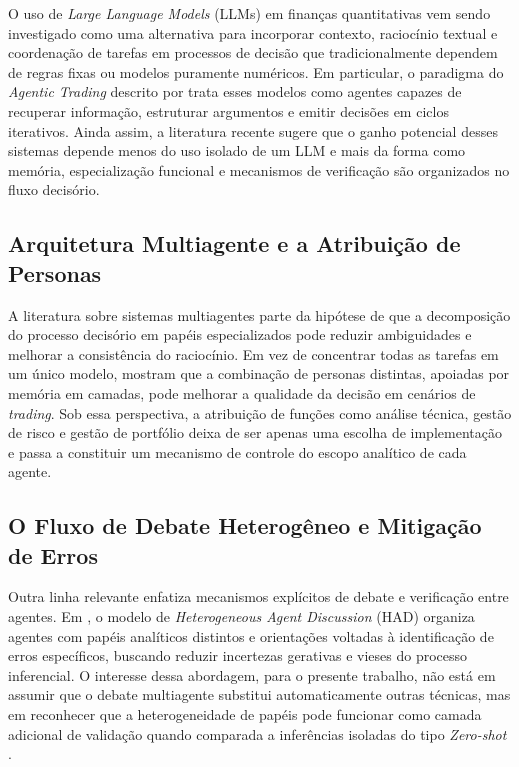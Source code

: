 \documentclass{eic-bcc-tcc}
\begin{document}
O uso de \textit{Large Language Models} (LLMs) em finanças quantitativas vem sendo investigado como uma alternativa para incorporar contexto, raciocínio textual e coordenação de tarefas em processos de decisão que tradicionalmente dependem de regras fixas ou modelos puramente numéricos. Em particular, o paradigma do \textit{Agentic Trading} descrito por \citet[p. 1]{Xia2026} trata esses modelos como agentes capazes de recuperar informação, estruturar argumentos e emitir decisões em ciclos iterativos. Ainda assim, a literatura recente sugere que o ganho potencial desses sistemas depende menos do uso isolado de um LLM e mais da forma como memória, especialização funcional e mecanismos de verificação são organizados no fluxo decisório.

\subsection{Arquitetura Multiagente e a Atribuição de Personas}

A literatura sobre sistemas multiagentes parte da hipótese de que a decomposição do processo decisório em papéis especializados pode reduzir ambiguidades e melhorar a consistência do raciocínio. Em vez de concentrar todas as tarefas em um único modelo, \citet[p. 1]{Li2023} mostram que a combinação de personas distintas, apoiadas por memória em camadas, pode melhorar a qualidade da decisão em cenários de \textit{trading}. Sob essa perspectiva, a atribuição de funções como análise técnica, gestão de risco e gestão de portfólio deixa de ser apenas uma escolha de implementação e passa a constituir um mecanismo de controle do escopo analítico de cada agente.

\subsection{O Fluxo de Debate Heterogêneo e Mitigação de Erros}

Outra linha relevante enfatiza mecanismos explícitos de debate e verificação entre agentes. Em \citet{Xing2024}, o modelo de \textit{Heterogeneous Agent Discussion} (HAD) organiza agentes com papéis analíticos distintos e orientações voltadas à identificação de erros específicos, buscando reduzir incertezas gerativas e vieses do processo inferencial. O interesse dessa abordagem, para o presente trabalho, não está em assumir que o debate multiagente substitui automaticamente outras técnicas, mas em reconhecer que a heterogeneidade de papéis pode funcionar como camada adicional de validação quando comparada a inferências isoladas do tipo \textit{Zero-shot} \citep[p. 5, p. 9]{Xing2024}.
\end{document}
